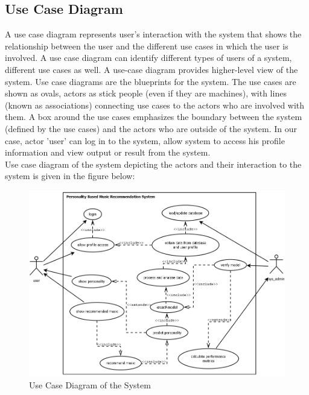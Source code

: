 \subsection{Use Case Diagram}
A use case diagram represents user's interaction with the system that shows the relationship between the user and the different use cases in which the user is involved. A use case diagram can identify different types of users of a system, different use cases as well. A use-case diagram provides higher-level view of the system. Use case diagrams are the blueprints for the system. The use cases are shown as ovals, actors as stick people (even if they are machines), with lines (known as associations) connecting use cases to the actors who are involved with them. A box around the use cases emphasizes the boundary between the system (defined by the use cases) and the actors who are outside of the system. In our case, actor 'user' can log in to the system, allow system to access his profile information and view output or result from the system.%
\\
Use case diagram of the system depicting the actors and their interaction to the system is given in the figure below:
\begin{figure}[!ht]
\centering
\includegraphics[width = 16 cm]{fig/new/usecase.png}
\caption{Use Case Diagram of the System}
\label{fig:usecase}
\end{figure}

